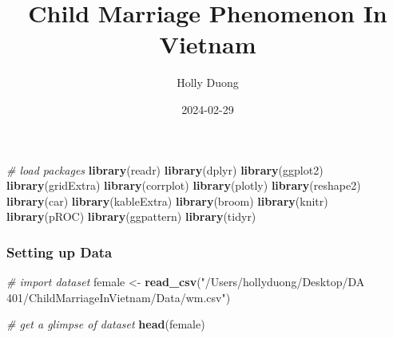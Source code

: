 \documentclass[
]{article}
\title{Child Marriage Phenomenon In Vietnam}
\author{Holly Duong}
\date{2024-02-29}
\newenvironment{Shaded}{\begin{snugshade}}{\end{snugshade}}
\newcommand{\CommentTok}[1]{\textcolor[rgb]{0.56,0.35,0.01}{\textit{#1}}}
\newcommand{\FunctionTok}[1]{\textcolor[rgb]{0.13,0.29,0.53}{\textbf{#1}}}
\newcommand{\NormalTok}[1]{#1}
\newcommand{\OtherTok}[1]{\textcolor[rgb]{0.56,0.35,0.01}{#1}}
\newcommand{\StringTok}[1]{\textcolor[rgb]{0.31,0.60,0.02}{#1}}
\begin{document}
\maketitle

\begin{Shaded}
\begin{Highlighting}[]
\CommentTok{\# load packages}
\FunctionTok{library}\NormalTok{(readr)}
\FunctionTok{library}\NormalTok{(dplyr)}
\FunctionTok{library}\NormalTok{(ggplot2)}
\FunctionTok{library}\NormalTok{(gridExtra)}
\FunctionTok{library}\NormalTok{(corrplot)}
\FunctionTok{library}\NormalTok{(plotly)}
\FunctionTok{library}\NormalTok{(reshape2)}
\FunctionTok{library}\NormalTok{(car)}
\FunctionTok{library}\NormalTok{(kableExtra)}
\FunctionTok{library}\NormalTok{(broom)}
\FunctionTok{library}\NormalTok{(knitr)}
\FunctionTok{library}\NormalTok{(pROC)}
\FunctionTok{library}\NormalTok{(ggpattern)}
\FunctionTok{library}\NormalTok{(tidyr)}
\end{Highlighting}
\end{Shaded}

\hypertarget{setting-up-data}{%
\subsubsection{Setting up Data}\label{setting-up-data}}

\begin{Shaded}
\begin{Highlighting}[]
\CommentTok{\# import dataset}
\NormalTok{female }\OtherTok{\textless{}{-}} \FunctionTok{read\_csv}\NormalTok{(}\StringTok{"/Users/hollyduong/Desktop/DA 401/ChildMarriageInVietnam/Data/wm.csv"}\NormalTok{)}
\end{Highlighting}
\end{Shaded}

\begin{Shaded}
\begin{Highlighting}[]
\CommentTok{\# get a glimpse of dataset}
\FunctionTok{head}\NormalTok{(female)}
\end{Highlighting}
\end{Shaded}
\end{document}
